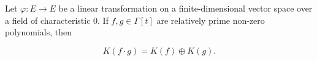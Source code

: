 Let $\varphi: E \to E$ be a linear transformation on a finite-dimensional vector space over a field of characteristic $0$. If $f, g \in \Gamma[t]$ are relatively prime non-zero polynomials, then

$$K(f \cdot g) = K(f) \oplus K(g).$$
